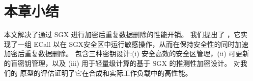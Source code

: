 \section{本章小结}
\label{sec:sgxdedup-sgxdedup-conclusion}

本文解决了通过 SGX 进行加密后重复数据删除的性能开销。 我们提出了 \sysnameS，它实现了一组 ECall 以在 SGX安全区中运行敏感操作，从而在保持安全性的同时加速加密后重复数据删除。 \sysnameS 包含三种密钥设计:(i) 安全高效的安全区管理，(ii) 可更新的盲密钥管理，以及 (iii) 用于轻量级计算的基于 SGX 的推测性加密设计。 对我们的 \sysnameS 原型的评估证明了它在合成和实际工作负载中的高性能。